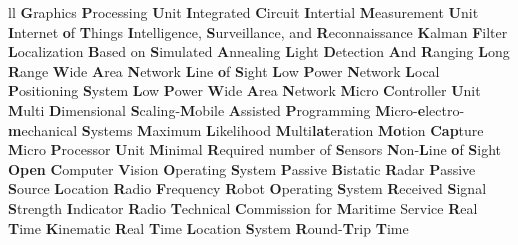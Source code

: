 \begin{abbreviations}{ll}
    		{\textbf{G}raphics \textbf{P}rocessing \textbf{U}nit}
    			{\textbf{I}ntegrated  \textbf{C}ircuit}
    		{\textbf{I}ntertial \textbf{M}easurement \textbf{U}nit}
    		{\textbf{I}nternet \textbf{o}f \textbf{T}hings}
    		{\textbf{I}ntelligence, \textbf{S}urveillance, and \textbf{R}econnaissance}
    			{\textbf{K}alman \textbf{F}ilter}
    		{\textbf{L}ocalization \textbf{B}ased on \textbf{S}imulated \textbf{A}nnealing}
    		{\textbf{L}ight \textbf{D}etection \textbf{A}nd \textbf{R}anging}
    	{\textbf{L}ong \textbf{R}ange \textbf{W}ide \textbf{A}rea \textbf{N}etwork}
    		{\textbf{L}ine   \textbf{o}f \textbf{S}ight}
    		{\textbf{L}ow \textbf{P}ower \textbf{N}etwork}
    		{\textbf{L}ocal \textbf{P}ositioning \textbf{S}ystem}
    		{\textbf{L}ow \textbf{P}ower \textbf{W}ide \textbf{A}rea \textbf{N}etwork}
    		{\textbf{M}icro \textbf{C}ontroller \textbf{U}nit}
    	{\textbf{M}ulti \textbf{D}imensional \textbf{S}caling-\textbf{M}obile \textbf{A}ssisted \textbf{P}rogramming}
    		{\textbf{M}icro-\textbf{e}lectro-\textbf{m}echanical \textbf{S}ystems}
    			{\textbf{M}aximum \textbf{L}ikelihood}
    		{\textbf{M}ulti\textbf{lat}eration}
    		{\textbf{Mo}tion \textbf{Cap}ture}
    		{\textbf{M}icro \textbf{P}rocessor \textbf{U}nit}
    		{\textbf{M}inimal \textbf{R}equired number of \textbf{S}ensors}
    		{\textbf{N}on-\textbf{L}ine \textbf{o}f \textbf{S}ight}
    		{\textbf{Open} \textbf{C}omputer \textbf{V}ision}
    			{\textbf{O}perating \textbf{S}ystem}
    		{\textbf{P}assive \textbf{B}istatic \textbf{R}adar}
    		{\textbf{P}assive \textbf{S}ource \textbf{L}ocation}
    	   		{\textbf{R}adio \textbf{F}requency}
    		{\textbf{R}obot \textbf{O}perating \textbf{S}ystem}
    		{\textbf{R}eceived \textbf{S}ignal \textbf{S}trength \textbf{I}ndicator}
    		{\textbf{R}adio \textbf{T}echnical \textbf{C}ommission for \textbf{M}aritime Service}
    		{\textbf{R}eal \textbf{T}ime \textbf{K}inematic}
    		{\textbf{R}eal \textbf{T}ime \textbf{L}ocation \textbf{S}ystem}
    		{\textbf{R}ound-\textbf{T}rip \textbf{T}ime}

\end{abbreviations}

